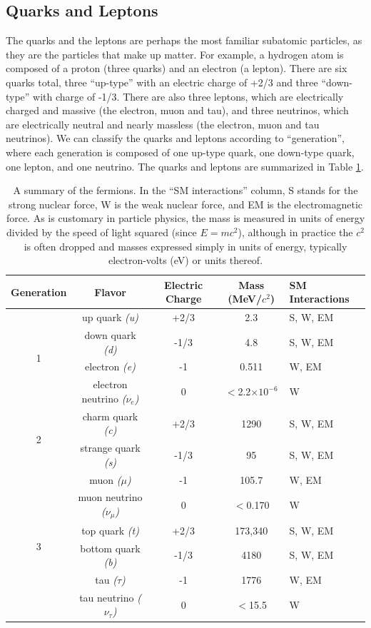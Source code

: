 \subsection{Quarks and Leptons}
The quarks and the leptons are perhaps the most familiar subatomic particles, as they are the particles that make up matter.  For example, a hydrogen atom is composed of a proton (three quarks) and an electron (a lepton).  There are six quarks total, three ``up-type'' with an electric charge of +2/3 and three ``down-type'' with charge of -1/3.  There are also three leptons, which are electrically charged and massive (the electron, muon and tau), and three neutrinos, which are electrically neutral and nearly massless (the electron, muon and tau neutrinos).  We can classify the quarks and leptons according to ``generation'', where each generation is composed of one up-type quark, one down-type quark, one lepton, and one neutrino.  The quarks and leptons are summarized in Table \ref{tab:QLTable}.

\begin{table}
	\caption{A summary of the fermions.  In the ``SM interactions'' column, S stands for the strong nuclear force, W is the weak nuclear force, and EM is the electromagnetic force.  As is customary in particle physics, the mass is measured in units of energy divided by the speed of light squared (since $E=mc^2$), although in practice the $c^2$ is often dropped and masses expressed simply in units of energy, typically electron-volts (eV) or units thereof. 	\label{tab:QLTable}}
	\begin{tabular}{| c || c | c | c | p{2cm} |}
		\hline
		Generation &  Flavor & Electric Charge & Mass (MeV/$c^2$) & SM Interactions\\
		\hline
		\multirow{4}{*}{1} & up quark \it{(u)} & +2/3 & 2.3 & S, W, EM\\
		    & down quark \it{(d)} & -1/3 & 4.8 & S, W, EM\\
		    & electron \it{(e)}& -1 & 0.511 & W, EM \\
		    & electron neutrino \it{($\nu_{e}$)} & 0 & $<$2.2$\times 10^{-6}$ & W\\
		\hline
		\multirow{2}{*}{2} & charm quark \it{(c)} & +2/3 & 1290 &  S, W, EM \\
		    & strange quark \it{(s)} & -1/3 & 95 & S, W, EM \\
		    & muon \it{($\mu$)} & -1& 105.7 & W, EM \\
		    & muon neutrino \it{($\nu_{\mu}$)} & 0 & $<$0.170 & W \\
		\hline 
		\multirow{2}{*}{3} & top quark \it{(t)} & +2/3 & 173,340 & S, W, EM \\
		    & bottom quark \it{(b)} & -1/3  & 4180 & S, W, EM \\ 
		    & tau \it{($\tau$)} & -1 & 1776 & W, EM\\
		    & tau neutrino \it{($\nu_{\tau}$)} & 0 & $<$15.5 & W\\		    
		\hline
	\end{tabular}
\end{table}


